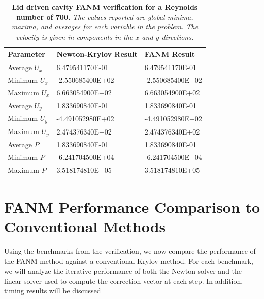 \begin{table}[h!]
  \begin{center}
    \begin{tabular}{lll}\hline\hline
      \multicolumn{1}{l}{Parameter}& 
      \multicolumn{1}{l}{Newton-Krylov Result}&
      \multicolumn{1}{l}{FANM Result}\\
      \hline
      Average $U_x$ & 6.479541170E-01 & 6.479541170E-01 \\
      Minimum $U_x$ & -2.550685400E+02 & -2.550685400E+02 \\
      Maximum $U_x$ & 6.663054900E+02 & 6.663054900E+02 \\
      \hline
      Average $U_y$ & 1.833690840E-01 & 1.833690840E-01 \\
      Minimum $U_y$ & -4.491052980E+02 & -4.491052980E+02 \\
      Maximum $U_y$ & 2.474376340E+02 & 2.474376340E+02 \\
      \hline
      Average $P$ & 1.833690840E-01 & 1.833690840E-01 \\
      Minimum $P$ & -6.241704500E+04 & -6.241704500E+04 \\
      Maximum $P$ & 3.518174810E+05 & 3.518174810E+05 \\
      \hline\hline
    \end{tabular}
  \end{center}
  \caption{\textbf{Lid driven cavity FANM verification for a Reynolds
      number of 700.} \textit{The values reported are global minima,
      maxima, and averages for each variable in the problem. The
      velocity is given in components in the $x$ and $y$ directions.}}
  \label{tab:driven_re700_results}
\end{table}

\clearpage

\section{FANM Performance Comparison to Conventional Methods\ }
\label{sec:fanm_comparison}

Using the benchmarks from the verification, we now compare the
performance of the FANM method against a conventional Krylov
method. For each benchmark, we will analyze the iterative performance
of both the Newton solver and the linear solver used to compute the
correction vector at each step. In addition, timing results will be discussed

